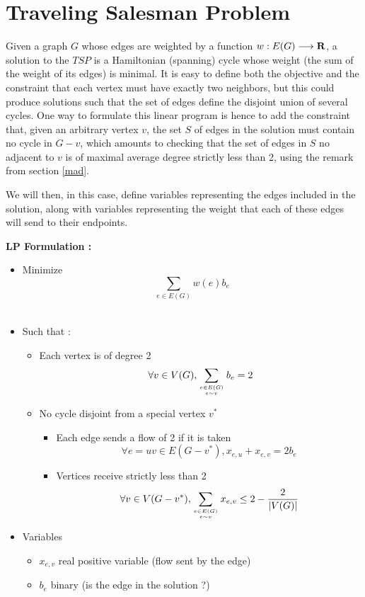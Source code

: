 \section{Traveling Salesman Problem}
Given a graph $G$ whose edges are weighted by a function $w:E(G) \longrightarrow \mathbf{R}$, a solution to the $TSP$ is a Hamiltonian (spanning) cycle whose weight (the sum of the weight of its edges) is minimal. It is easy to define both the objective and the constraint that each vertex must have exactly two neighbors, but this could produce solutions such that the set of edges define the disjoint union of several cycles. One way to formulate this linear program is hence to add the constraint that, given an arbitrary vertex $v$, the set $S$ of edges in the solution must contain no cycle in $G-v$, which amounts to checking that the set of edges in $S$ no adjacent to $v$ is of maximal average degree strictly less than 2, using the remark from section \ref{mad}.

We will then, in this case, define variables representing the edges included in the solution, along with variables representing the weight that each of these edges will send to their endpoints.

{\bf LP Formulation :}
\begin{itemize}
\item Minimize $$\sum_{e\in E(G)}w(e) b_e$$\\
\item Such that :
  \begin{itemize}
  \item Each vertex is of degree 2
    $$\forall v\in V(G), \sum_{e\in E(G)\atop e\sim v}b_e = 2$$
  \item No cycle disjoint from a special vertex $v^*$
    \begin{itemize}
    \item Each edge sends a flow of 2 if it is taken
      $$\forall e=uv\in E(G-v^*), x_{e,u} + x_{e,v} = 2b_e$$
    \item Vertices receive strictly less than 2
      $$\forall v\in V(G-v^*), \sum_{e\in E(G)\atop e\sim v}x_{e,v}\leq 2-\frac 2 {|V(G)|}$$
    \end{itemize}

  \end{itemize}
\item Variables
  \begin{itemize}
  \item $x_{e,v}$ real positive variable (flow sent by the edge)
  \item $b_e$ binary (is the edge in the solution ?)

  \end{itemize}
\end{itemize}

